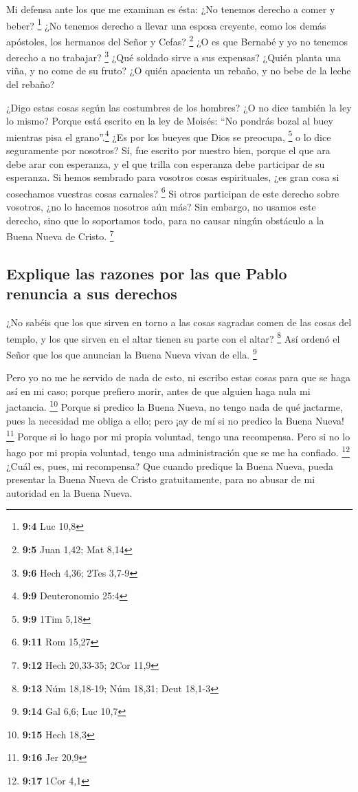  Mi defensa ante los que me examinan es ésta:
 ¿No tenemos derecho a comer y beber? \footnote{\textbf{9:4}
  Luc 10,8}  ¿No tenemos derecho a llevar una esposa
creyente, como los demás apóstoles, los hermanos del Señor y Cefas?
\footnote{\textbf{9:5} Juan 1,42; Mat 8,14}  ¿O es que
Bernabé y yo no tenemos derecho a no trabajar? \footnote{\textbf{9:6}
  Hech 4,36; 2Tes 3,7-9}  ¿Qué soldado sirve a sus
expensas? ¿Quién planta una viña, y no come de su fruto? ¿O quién
apacienta un rebaño, y no bebe de la leche del rebaño?

 ¿Digo estas cosas según las costumbres de los hombres? ¿O
no dice también la ley lo mismo?  Porque está escrito en
la ley de Moisés: ``No pondrás bozal al buey mientras pisa el
grano''.\footnote{\textbf{9:9} Deuteronomio 25:4} ¿Es por los bueyes que
Dios se preocupa, \footnote{\textbf{9:9} 1Tim 5,18}  o lo
dice seguramente por nosotros? Sí, fue escrito por nuestro bien, porque
el que ara debe arar con esperanza, y el que trilla con esperanza debe
participar de su esperanza.  Si hemos sembrado para
vosotros cosas espirituales, ¿es gran cosa si cosechamos vuestras cosas
carnales? \footnote{\textbf{9:11} Rom 15,27}  Si otros
participan de este derecho sobre vosotros, ¿no lo hacemos nosotros aún
más? Sin embargo, no usamos este derecho, sino que lo soportamos todo,
para no causar ningún obstáculo a la Buena Nueva de Cristo. \footnote{\textbf{9:12}
  Hech 20,33-35; 2Cor 11,9}

\hypertarget{explique-las-razones-por-las-que-pablo-renuncia-a-sus-derechos}{%
\subsection{Explique las razones por las que Pablo renuncia a sus
derechos}\label{explique-las-razones-por-las-que-pablo-renuncia-a-sus-derechos}}

 ¿No sabéis que los que sirven en torno a las cosas
sagradas comen de las cosas del templo, y los que sirven en el altar
tienen su parte con el altar? \footnote{\textbf{9:13} Núm 18,18-19; Núm
  18,31; Deut 18,1-3}  Así ordenó el Señor que los que
anuncian la Buena Nueva vivan de ella. \footnote{\textbf{9:14} Gal 6,6;
  Luc 10,7}

 Pero yo no me he servido de nada de esto, ni escribo
estas cosas para que se haga así en mi caso; porque prefiero morir,
antes de que alguien haga nula mi jactancia. \footnote{\textbf{9:15}
  Hech 18,3}  Porque si predico la Buena Nueva, no tengo
nada de qué jactarme, pues la necesidad me obliga a ello; pero ¡ay de mí
si no predico la Buena Nueva! \footnote{\textbf{9:16} Jer 20,9}
 Porque si lo hago por mi propia voluntad, tengo una
recompensa. Pero si no lo hago por mi propia voluntad, tengo una
administración que se me ha confiado. \footnote{\textbf{9:17} 1Cor 4,1}
 ¿Cuál es, pues, mi recompensa? Que cuando predique la
Buena Nueva, pueda presentar la Buena Nueva de Cristo gratuitamente,
para no abusar de mi autoridad en la Buena Nueva.

